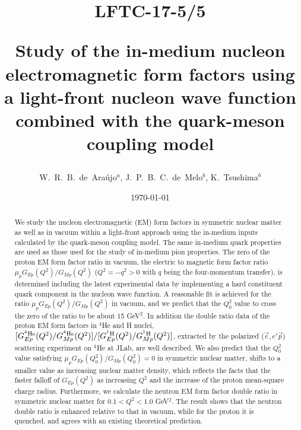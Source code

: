 \documentclass[preprint,aps,showpacs,floatfix]{revtex4}
\begin{document}
\title{
\vspace{-1cm} 
\begin{flushright}
    {\large LFTC-17-5/5 \vspace{1cm}}
\end{flushright}
Study of the in-medium nucleon electromagnetic form factors  
using a light-front nucleon wave function combined  
with the quark-meson coupling model}

\author{W.~R.~B.~de~Ara\'ujo$^a$, J.~P.~B.~C.~de~Melo$^b$, K.~Tsushima$^b $}
\date{\today}

\begin{abstract}
We study the nucleon electromagnetic (EM) form factors in symmetric nuclear matter 
as well as in vacuum within a light-front approach using the in-medium inputs  
calculated by the quark-meson coupling model.
The same in-medium quark properties are used as those  
used for the study of in-medium pion properties.
The zero of the proton EM form factor ratio in vacuum, 
the electric to magnetic form factor ratio $\mu_p G_{Ep}(Q^2)/G_{Mp}(Q^2)$  
($Q^2 = -q^2 > 0$ with $q$ being the four-momentum transfer),
is determined including the latest experimental data   
by implementing a hard constituent quark component in the nucleon wave function. 
A reasonable fit is achieved for the ratio $\mu_pG_{Ep}(Q^2)/G_{Mp}(Q^2)$ in 
vacuum, and we predict that the $Q_0^2$ value to cross the zero  
of the ratio to be about 15 GeV$^2$. 
In addition the double ratio data of the proton EM form factors 
in $^4$He and H nuclei, 
$[G^{^4{\rm He}}_{Ep}(Q^2)/G^{^4{\rm He}}_{Mp}(Q^2)]/[G^{^1{\rm H}}_{Ep}(Q^2)/G^{^1{\rm H}}_{Mp}(Q^2)]$,  
extracted by the polarized ($\vec{e}, e' \vec{p}$) 
scattering experiment on $^4$He at JLab, are well described. 
We also predict that the $Q_0^2$ value satisfying $\mu_pG_{Ep}(Q_0^2)/G_{Mp}(Q_0^2) = 0$  
in symmetric nuclear matter, shifts to a smaller value as increasing nuclear matter density,   
which reflects the facts that the faster falloff of $G_{Ep}(Q^2)$ as increasing $Q^2$   
and the increase of the proton mean-square charge radius.  
Furthermore, we calculate the neutron EM form factor double ratio 
in symmetric nuclear matter for $0.1 < Q^2 < 1.0$ GeV$^2$.  
The result shows that the neutron double ratio is enhanced 
relative to that in vacuum, while for the proton it is quenched, and  
agrees with an existing theoretical prediction.   
\end{abstract}
\maketitle
\end{document}
